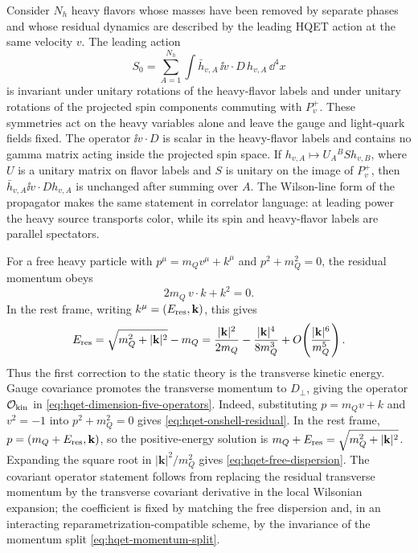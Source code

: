 Consider \(N_h\) heavy flavors whose masses have been removed by separate
phases and whose residual dynamics are described by the leading HQET action at
the same velocity \(v\).  The leading action
\[
  S_0=\sum_{A=1}^{N_h}\int \bar h_{v,A}\,\ii v\cdot D\,h_{v,A}\,\dd^4x
\]
is invariant under unitary rotations of the heavy-flavor labels and under
unitary rotations of the projected spin components commuting with \(P_v^+\).
These symmetries act on the heavy variables alone and leave the gauge and
light-quark fields fixed.
The operator \(\ii v\cdot D\) is scalar in the heavy-flavor labels and
contains no gamma matrix acting inside the projected spin space.  If
\(h_{v,A}\mapsto U_A{}^B Sh_{v,B}\), where \(U\) is a unitary matrix on flavor
labels and \(S\) is unitary on the image of \(P_v^+\), then
\(\bar h_{v,A}\ii v\cdot D h_{v,A}\) is unchanged after summing over \(A\).
The Wilson-line form of the propagator makes the same statement in correlator
language: at leading power the heavy source transports color, while its spin
and heavy-flavor labels are parallel spectators.

For a free heavy particle with \(p^\mu=m_Qv^\mu+k^\mu\) and \(p^2+m_Q^2=0\),
the residual momentum obeys
\begin{equation}
  2m_Q\,v\cdot k+k^2=0 .
  \label{eq:hqet-onshell-residual}
\end{equation}
In the rest frame, writing \(k^\mu=(E_{\rm res},\mathbf k)\), this gives
\begin{equation}
  E_{\rm res}
  =
  \sqrt{m_Q^2+|\mathbf k|^2}-m_Q
  =
  \frac{|\mathbf k|^2}{2m_Q}
  -\frac{|\mathbf k|^4}{8m_Q^3}
  +O\!\left(\frac{|\mathbf k|^6}{m_Q^5}\right).
  \label{eq:hqet-free-dispersion}
\end{equation}
Thus the first correction to the static theory is the transverse kinetic
energy.  Gauge covariance promotes the transverse momentum to \(D_\perp\),
giving the operator \(\mathcal O_{\rm kin}\) in
\eqref{eq:hqet-dimension-five-operators}.
Indeed, substituting \(p=m_Qv+k\) and \(v^2=-1\) into \(p^2+m_Q^2=0\) gives
\eqref{eq:hqet-onshell-residual}.  In the rest frame,
\(p=(m_Q+E_{\rm res},\mathbf k)\), so the positive-energy solution is
\(m_Q+E_{\rm res}=\sqrt{m_Q^2+|\mathbf k|^2}\).  Expanding the square root in
\(|\mathbf k|^2/m_Q^2\) gives \eqref{eq:hqet-free-dispersion}.  The covariant
operator statement follows from replacing the residual transverse momentum by
the transverse covariant derivative in the local Wilsonian expansion; the
coefficient is fixed by matching the free dispersion and, in an interacting
reparametrization-compatible scheme, by the invariance of the momentum split
\eqref{eq:hqet-momentum-split}.

